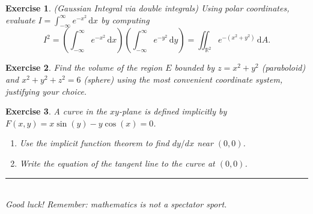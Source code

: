 \documentclass[12pt,a4paper]{article}
\theoremstyle{exercise}
\newtheorem{exercise}{Exercise}[section]
\theoremstyle{hint}
\newcommand{\R}{\mathbb{R}}
\newcommand{\dd}{\,\mathrm{d}}
\begin{document}
\begin{exercise}
\emph{(Gaussian Integral via double integrals)}  Using polar coordinates,
evaluate $I=\displaystyle\int_{-\infty}^{\infty}e^{-x^{2}}\dd x$ by
computing
\[
  I^{2}=
  \left(\int_{-\infty}^{\infty}e^{-x^{2}}\dd x\right)
  \!\left(\int_{-\infty}^{\infty}e^{-y^{2}}\dd y\right)
  =\iint_{\R^{2}}e^{-(x^{2}+y^{2})}\dd A.
\]
\end{exercise}

\begin{exercise}
Find the volume of the region $E$ bounded by
$z=x^{2}+y^{2}$ (paraboloid) and $x^{2}+y^{2}+z^{2}=6$
(sphere) using the most convenient coordinate system, justifying your
choice.
\end{exercise}

\begin{exercise}
A curve in the $xy$-plane is defined implicitly by
$F(x,y)=x\sin(y)-y\cos(x)=0$.
\begin{enumerate}[label=(\alph*)]
  \item Use the implicit function theorem to find $dy/dx$ near $(0,0)$.
  \item Write the equation of the tangent line to the curve at $(0,0)$.
\end{enumerate}
\end{exercise}

\bigskip
\begin{center}
  \rule{0.6\linewidth}{0.4pt}\\[4pt]
  {\small\itshape Good luck! Remember: mathematics is not a spectator sport.}
\end{center}
\end{document}
